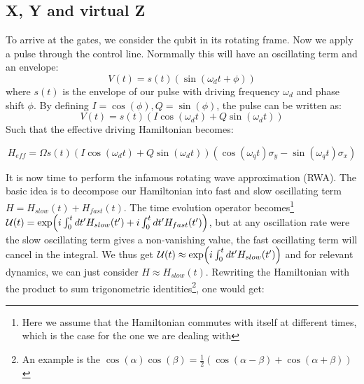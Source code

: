 \subsection{X, Y and virtual Z}\label{sec:how_to_make_gates}
To arrive at the gates, we consider the qubit in its rotating frame. Now we apply a pulse through the control line. Normmally this will have an oscillating term and an envelope:
\begin{equation}
    V(t) = s(t) (\sin(\omega_d t + \phi))
\end{equation}
where $s(t)$ is the envelope of our pulse with driving frequency $\omega_d$ and phase shift $\phi$. By defining $I = \cos(\phi), Q = \sin(\phi)$, the pulse can be written as:
\begin{equation}
    V(t) = s(t) \left(I \cos(\omega_d t) + Q \sin(\omega_d t)\right) 
\end{equation}
Such that the effective driving Hamiltonian becomes:
\begin{fullwidth}
\begin{equation}
    H_{eff} = \Omega s(t) \left(I \cos(\omega_d t) + Q \sin(\omega_d t)\right)   \left(\cos(\omega_q t)\sigma_y - \sin(\omega_q t) \sigma_x \right)
\end{equation}
\end{fullwidth}
It is now time to perform the infamous rotating wave approximation (RWA). The basic idea is to decompose our Hamiltonian into fast and slow oscillating term $H = H_{slow}(t) + H_{fast}(t)$. The time evolution operator becomes\footnote{Here we assume that the Hamiltonian commutes with itself at different times, which is the case for the one we are dealing with} $\mathcal{U}(t) = \exp(i\int_0^tdt'H_{slow}(t') + i\int_0^tdt'H_{fast}(t'))$, but at any oscillation rate were the slow oscillating term gives a non-vanishing value, the fast oscillating term will cancel in the integral. We thus get $\mathcal{U}(t) \approx \exp(i\int_0^tdt'H_{slow}(t'))$ and for relevant dynamics, we can just consider $H\approx H_{slow}(t)$. 
Rewriting the Hamiltonian with the product to sum trigonometric identities\footnote{An example is the $\cos(\alpha)\cos(\beta)=\frac{1}{2}(\cos(\alpha-\beta) + \cos(\alpha + \beta))$}, one would get: 


